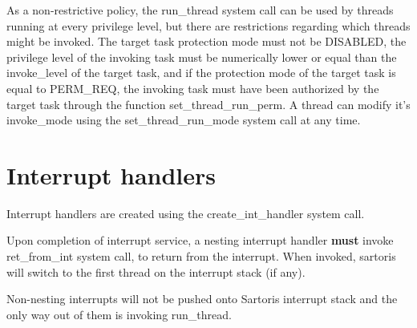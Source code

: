 \documentclass[11pt, letterpaper, twoside, english]{book}
\begin{document}
As a non-restrictive policy, the \textsf{run\_thread} system call can be used by threads running at every privilege level, but there are restrictions regarding which threads might be invoked. The target task protection mode must not be \textsf{DISABLED}, the privilege level of the invoking task must be numerically lower or equal than the \textsf{invoke\_level} of the target task, and if the protection mode of the target task is equal to \textsf{PERM\_REQ}, the invoking task must have been authorized by the target task through the function \textsf{set\_thread\_run\_perm}.
A thread can modify it's \textsf{invoke\_mode} using the \textsf{set\_thread\_run\_mode} system call at any time. 
       
\section{Interrupt handlers}
Interrupt handlers are created using the \textsf{create\_int\_handler} system call.

Upon completion of interrupt service, a \textsf{nesting} interrupt handler \textbf{must} invoke \textsf{ret\_from\_int} system call, to return from the interrupt. When invoked, sartoris will switch to the first thread on the interrupt stack (if any).

Non-nesting interrupts will not be pushed onto Sartoris interrupt stack and the only way out of them is invoking \textsf{run\_thread}.
       
\end{document}
